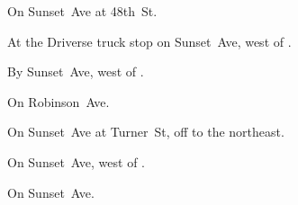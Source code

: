 
\begin{LocationList}

On  Sunset~Ave at 48th~St.

At the Driverse truck stop on  Sunset~Ave, west of .

By  Sunset~Ave, west of .

On  Robinson~Ave.

On Sunset~Ave at Turner~St, off  to the northeast.

On  Sunset~Ave, west of .

On  Sunset~Ave.

\end{LocationList}
